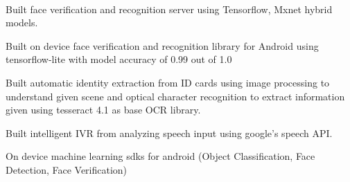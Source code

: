  \\

\vspace{\topsep} %
\begin{tightitemize} 
\item Built face verification and recognition server using Tensorflow, Mxnet hybrid models.
\item Built on device face verification and recognition library for Android using tensorflow-lite with model accuracy of 0.99 out of 1.0
\item Built automatic identity extraction from ID cards using image processing to understand given scene and optical character recognition to extract information given using tesseract 4.1 as base OCR library.
\item Built intelligent IVR from analyzing speech input using google's speech API.
\item On device machine learning sdks for android (Object Classification, Face Detection, Face Verification)
\end{tightitemize}

\sectionspace %